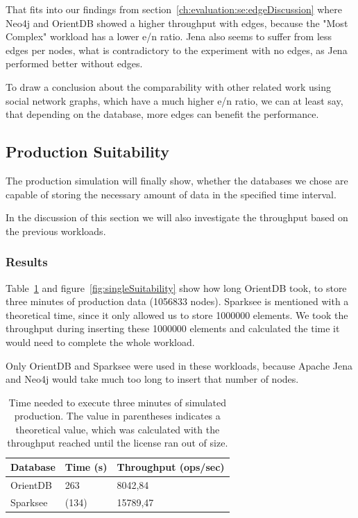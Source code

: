 That fits into our findings from section~\ref{ch:evaluation:se:edgeDiscussion} where Neo4j and OrientDB showed a higher throughput with edges,
because the "Most Complex" workload has a lower e/n ratio.
Jena also seems to suffer from less edges per nodes,
what is contradictory to the experiment with no edges,
as Jena performed better without edges.

To draw a conclusion about the comparability with other related work using social network graphs,
which have a much higher e/n ratio,
we can at least say,
that depending on the database,
more edges can benefit the performance.

\subsection{Production Suitability}
\label{ch:evaluation:se:productionSuitability}
The production simulation will finally show,
whether the databases we chose are capable of storing the necessary amount of data in the specified time interval.

In the discussion of this section we will also investigate the throughput based on the previous workloads.

\subsubsection{Results}
Table~\ref{tab:singleSuitability} and figure~\ref{fig:singleSuitability} show how long OrientDB took,
to store three minutes of production data (1056833 nodes).
Sparksee is mentioned with a theoretical time,
since it only allowed us to store 1000000 elements.
We took the throughput during inserting these 1000000 elements and calculated the time it would need to complete the whole workload.

Only OrientDB and Sparksee were used in these workloads,
because Apache Jena and Neo4j would take much too long to insert that number of nodes.

\begin{table}[h!]
  \begin{minipage}{\textwidth}
    \centering
    \begin{tabular}{ | l | l | l | }
      \hline
      Database & Time (s) & Throughput (ops/sec) \\ \hline
      OrientDB & 263 & 8042,84 \\ \hline
      Sparksee & (134) & 15789,47 \\ \hline
    \end{tabular}
  \end{minipage}
  \caption{Time needed to execute three minutes of simulated production.
  The value in parentheses indicates a theoretical value,
  which was calculated with the throughput reached until the license ran out of size.}
  \label{tab:singleSuitability}
\end{table}

